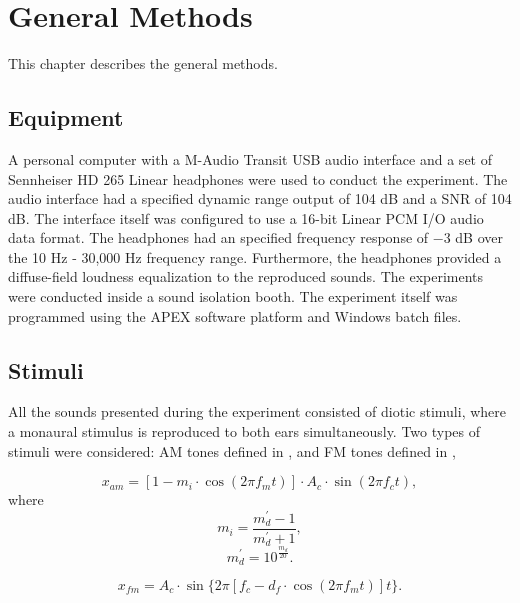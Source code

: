 \documentclass[../main.tex]{subfiles}
\begin{document}
\chapter{General Methods}
\label{cha:methods}

This chapter describes the general methods.

\section{Equipment}

A personal computer with a M-Audio Transit USB audio interface
\cite{maudio:transitusb} and a set of Sennheiser HD 265 Linear headphones
\cite{sennheiser:hd265linear} were used to conduct the experiment. The audio
interface had a specified dynamic range output of 104 dB and a \gls{SNR} of 104
dB. The interface itself was configured to use a 16-bit Linear \gls{PCM}
\gls{I/O} audio data format. The headphones had an specified frequency response
of $-3$ dB over the 10 Hz - 30,000 Hz frequency range. Furthermore, the
headphones provided a diffuse-field loudness equalization to the reproduced
sounds. The experiments were conducted inside a sound isolation booth. The
experiment itself was programmed using the APEX software platform
\cite{Francart2008} and Windows batch files.

\section{Stimuli}
\label{sec:stimuli}

All the sounds presented during the experiment consisted of diotic stimuli,
where a monaural stimulus is reproduced to both ears simultaneously. Two types
of stimuli were considered: \gls{AM} tones defined in , and \gls{FM}
tones defined in ,

\begin{equation}
  x_{am} = [1 - m_i \cdot \cos(2 \pi f_m t)] \cdot A_c \cdot \sin(2 \pi f_c t),
  \label{eq:am}
\end{equation}
where
\begin{equation}
  m_i = \frac{m_d^{\prime}-1}{m_d^{\prime}+1},
\end{equation}
\begin{equation}
  m_d^{\prime} = 10^{\frac{m_d}{20}}.
\end{equation}

\begin{equation}
  x_{fm} = A_c \cdot \sin \{2 \pi [f_c - d_f \cdot \cos(2 \pi f_m t)] t \}.
  \label{eq:fm}
\end{equation}
\end{document}
